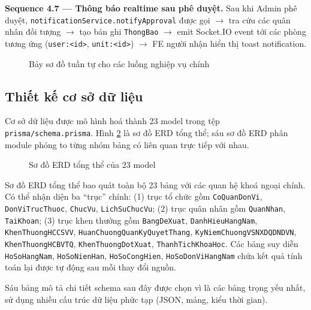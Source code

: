 \documentclass[../DoAn.tex]{subfiles}
\begin{document}
\textbf{Sequence 4.7 --- Thông báo realtime sau phê duyệt.} Sau khi Admin phê duyệt, \texttt{notificationService.notifyApproval} được gọi $\rightarrow$ tra cứu các quân nhân đối tượng $\rightarrow$ tạo bản ghi \texttt{ThongBao} $\rightarrow$ emit Socket.IO event tới các phòng tương ứng (\texttt{user:<id>}, \texttt{unit:<id>}) $\rightarrow$ FE người nhận hiển thị toast notification.

\begin{figure}[H]
    \centering
    \caption{Bảy sơ đồ tuần tự cho các luồng nghiệp vụ chính}
    \label{fig:tuantu-7luong}
\end{figure}

\subsection{Thiết kế cơ sở dữ liệu}
\label{subsection:4.1.7}

Cơ sở dữ liệu được mô hình hoá thành 23 model trong tệp \texttt{prisma/schema.prisma}. Hình \ref{fig:erd-tongthe} là sơ đồ ERD tổng thể; sáu sơ đồ ERD phân module phóng to từng nhóm bảng có liên quan trực tiếp với nhau.

\begin{figure}[H]
    \centering
    \caption{Sơ đồ ERD tổng thể của 23 model}
    \label{fig:erd-tongthe}
\end{figure}

Sơ đồ ERD tổng thể bao quát toàn bộ 23 bảng với các quan hệ khoá ngoại chính. Có thể nhận diện ba ``trục'' chính: (1) trục tổ chức gồm \texttt{CoQuanDonVi}, \texttt{DonViTrucThuoc}, \texttt{ChucVu}, \texttt{LichSuChucVu}; (2) trục quân nhân gồm \texttt{QuanNhan}, \texttt{TaiKhoan}; (3) trục khen thưởng gồm \texttt{BangDeXuat}, \texttt{DanhHieuHangNam}, \texttt{KhenThuongHCCSVV}, \texttt{HuanChuongQuanKyQuyetThang}, \texttt{KyNiemChuongVSNXDQDNDVN}, \texttt{KhenThuongHCBVTQ}, \texttt{KhenThuongDotXuat}, \texttt{ThanhTichKhoaHoc}. Các bảng suy diễn \texttt{HoSoHangNam}, \texttt{HoSoNienHan}, \texttt{HoSoCongHien}, \texttt{HoSoDonViHangNam} chứa kết quả tính toán lại được tự động sau mỗi thay đổi nguồn.

Sáu bảng mô tả chi tiết schema sau đây được chọn vì là các bảng trọng yếu nhất, sử dụng nhiều cấu trúc dữ liệu phức tạp (JSON, mảng, kiểu thời gian).
\end{document}
